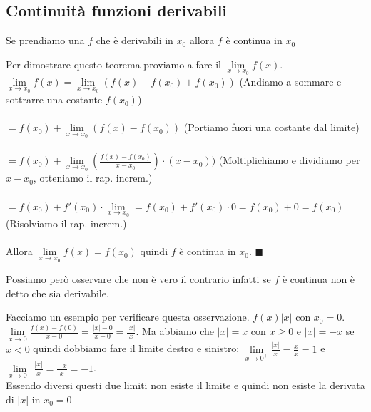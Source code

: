 \subsection{Continuità funzioni derivabili}
\begin{theorem}
    Se prendiamo una $f$ che è derivabili in $x_0$ allora $f$ è continua in $x_0$
\end{theorem}
\begin{demostration}
Per dimostrare questo teorema proviamo a fare il $\lim\limits_{x \to x_0}f(x)$.\\
$\lim\limits_{x \to x_0}f(x) = \lim\limits_{x\to x_0}(f(x) - f(x_0) + f(x_0))$ (Andiamo a sommare e sottrarre una costante $f(x_0)$)\\\\
$= f(x_0) + \lim\limits_{x\to x_0}(f(x) - f(x_0))$ (Portiamo fuori una costante dal limite)\\\\
$= f(x_0) + \lim\limits_{x\to x_0}(\frac{f(x) - f(x_0)}{x - x_0}) \cdot (x - x_0))$ (Moltiplichiamo e dividiamo per $x - x_0$, otteniamo il rap. increm.)\\\\
$= f(x_0) + f'(x_0) \cdot \lim\limits_{x\to x_0} = f(x_0) + f'(x_0) \cdot 0 = f(x_0) + 0 = f(x_0)$ (Risolviamo il rap. increm.)\\\\
Allora $\lim\limits_{x\to x_0}f(x) = f(x_0)$ quindi $f$ è continua in $x_0$. $\blacksquare$
\end{demostration}

\begin{observation}
Possiamo però osservare che non è vero il contrario infatti se $f$ è continua non è detto che sia derivabile.
\end{observation}

\begin{example}
Facciamo un esempio per verificare questa osservazione. $f(x) |x|$ con $x_0 = 0$.\\
$\lim\limits_{x \to 0}\frac{f(x) - f(0)}{x - 0} = \frac{|x| - 0}{x - 0} = \frac{|x|}{x}$.
Ma abbiamo che $|x| = x$ con $x\geq 0$ e $|x| = -x$ se $x < 0$ quindi dobbiamo fare il limite destro e sinistro:
$\lim\limits_{x\to 0^+}\frac{|x|}{x} = \frac{x}{x} = 1$ e $\lim\limits_{x\to 0^-}\frac{|x|}{x} = \frac{-x}{x} = -1$.\\
Essendo diversi questi due limiti non esiste il limite e quindi non esiste la derivata di $|x|$ in $x_0 = 0$
\end{example} 

